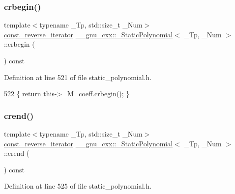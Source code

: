 \subsubsection{\texorpdfstring{crbegin()}{crbegin()}}
{\footnotesize\ttfamily template$<$typename \+\_\+\+Tp, std\+::size\+\_\+t \+\_\+\+Num$>$ \\
\hyperlink{class____gnu__cxx_1_1__StaticPolynomial_a03b96649dc974fc6829342659325b7cb}{const\+\_\+reverse\+\_\+iterator} \hyperlink{class____gnu__cxx_1_1__StaticPolynomial}{\+\_\+\+\_\+gnu\+\_\+cxx\+::\+\_\+\+Static\+Polynomial}$<$ \+\_\+\+Tp, \+\_\+\+Num $>$\+::crbegin (\begin{DoxyParamCaption}{ }\end{DoxyParamCaption}) const\hspace{0.3cm}{\ttfamily [inline]}}



Definition at line 521 of file static\+\_\+polynomial.\+h.


\begin{DoxyCode}
522       \{ \textcolor{keywordflow}{return} this->\_M\_coeff.crbegin(); \}
\end{DoxyCode}
\mbox{\label{class____gnu__cxx_1_1__StaticPolynomial_a45090c24cf0cf08e0a7c311fc0609a52}} 
\subsubsection{\texorpdfstring{crend()}{crend()}}
{\footnotesize\ttfamily template$<$typename \+\_\+\+Tp, std\+::size\+\_\+t \+\_\+\+Num$>$ \\
\hyperlink{class____gnu__cxx_1_1__StaticPolynomial_a03b96649dc974fc6829342659325b7cb}{const\+\_\+reverse\+\_\+iterator} \hyperlink{class____gnu__cxx_1_1__StaticPolynomial}{\+\_\+\+\_\+gnu\+\_\+cxx\+::\+\_\+\+Static\+Polynomial}$<$ \+\_\+\+Tp, \+\_\+\+Num $>$\+::crend (\begin{DoxyParamCaption}{ }\end{DoxyParamCaption}) const\hspace{0.3cm}{\ttfamily [inline]}}



Definition at line 525 of file static\+\_\+polynomial.\+h.



